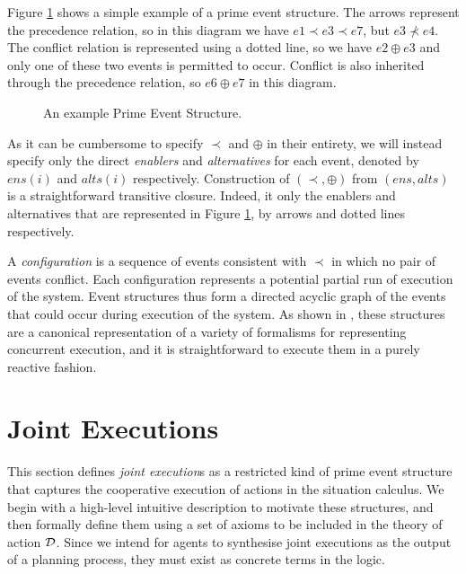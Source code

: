 Figure \ref{fig:example-pes} shows a simple example of a prime event
structure. The arrows represent the precedence relation, so in this
diagram we have $e1\prec e3\prec e7$, but $e3\not\prec e4$. The
conflict relation is represented using a dotted line, so we have $e2\oplus e3$
and only one of these two events is permitted to occur. Conflict is
also inherited through the precedence relation, so $e6\oplus e7$
in this diagram. 

%
\begin{figure}

\caption{An example Prime Event Structure.}


\label{fig:example-pes} 
\end{figure}


As it can be cumbersome to specify $\prec$ and $\oplus$ in their
entirety, we will instead specify only the direct \emph{enablers}
and \emph{alternatives} for each event, denoted by $ens(i)$ and $alts(i)$
respectively. Construction of $(\prec,\oplus)$ from $(ens,alts)$
is a straightforward transitive closure. Indeed, it only the enablers
and alternatives that are represented in Figure \ref{fig:example-pes},
by arrows and dotted lines respectively.

A \emph{configuration} is a sequence of events consistent with $\prec$
in which no pair of events conflict. Each configuration represents
a potential partial run of execution of the system. Event structures
thus form a directed acyclic graph of the events that could occur
during execution of the system. As shown in \citep{pratt91modeling_conc_with_geom},
these structures are a canonical representation of a variety of formalisms
for representing concurrent execution, and it is straightforward to
execute them in a purely reactive fashion.


\section{Joint Executions\label{sec:JointExec:JEs}}

This section defines \emph{joint execution}s as a restricted kind
of prime event structure that captures the cooperative execution of
actions in the situation calculus. We begin with a high-level intuitive
description to motivate these structures, and then formally define
them using a set of axioms to be included in the theory of action
$\mathcal{D}$. Since we intend for agents to synthesise joint executions
as the output of a planning process, they must exist as concrete terms
in the logic.


